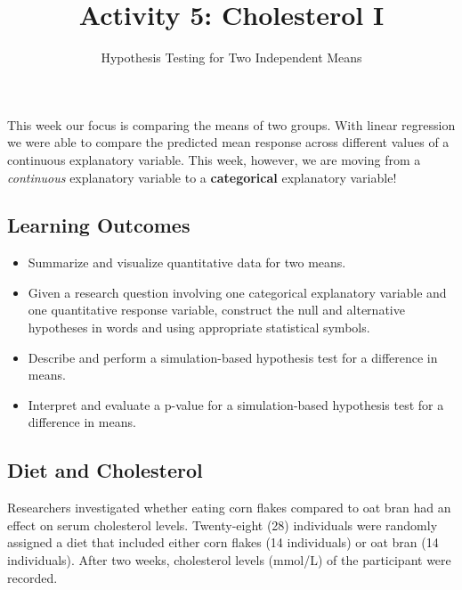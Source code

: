 \documentclass[
  letterpaper,
  DIV=11,
  numbers=noendperiod]{scrartcl}
\title{Activity 5: Cholesterol I}
\subtitle{Hypothesis Testing for Two Independent Means}
\author{}
\date{}
\begin{document}
\maketitle
\ifdefined\Shaded\renewenvironment{Shaded}{\begin{tcolorbox}[sharp corners, borderline west={3pt}{0pt}{shadecolor}, enhanced, breakable, frame hidden, interior hidden, boxrule=0pt]}{\end{tcolorbox}}\fi

This week our focus is comparing the means of two groups. With linear
regression we were able to compare the predicted mean response across
different values of a continuous explanatory variable. This week,
however, we are moving from a \emph{continuous} explanatory variable to
a \textbf{categorical} explanatory variable!

\hypertarget{learning-outcomes}{%
\subsection{Learning Outcomes}\label{learning-outcomes}}

\begin{itemize}
\item
  Summarize and visualize quantitative data for two means.
\item
  Given a research question involving one categorical explanatory
  variable and one quantitative response variable, construct the null
  and alternative hypotheses in words and using appropriate statistical
  symbols.
\item
  Describe and perform a simulation-based hypothesis test for a
  difference in means.
\item
  Interpret and evaluate a p-value for a simulation-based hypothesis
  test for a difference in means.
\end{itemize}

\hypertarget{diet-and-cholesterol}{%
\subsection{Diet and Cholesterol}\label{diet-and-cholesterol}}

Researchers investigated whether eating corn flakes compared to oat bran
had an effect on serum cholesterol levels. Twenty-eight (28) individuals
were randomly assigned a diet that included either corn flakes (14
individuals) or oat bran (14 individuals). After two weeks, cholesterol
levels (mmol/L) of the participant were recorded.
\end{document}
